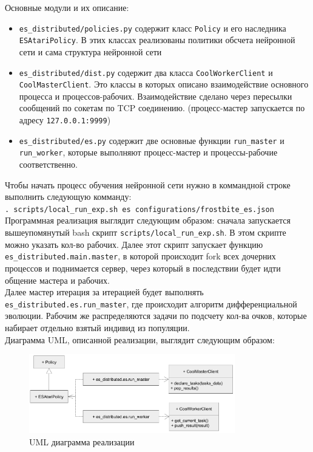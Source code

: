 \documentclass[12pt]{article}
\begin{document}
    Основные модули и их описание:
    \begin{itemize}
        \item \verb!es_distributed/policies.py! содержит класс \verb!Policy! и его наследника \verb!ESAtariPolicy!. В этих классах реализованы политики обсчета нейронной сети и сама структура нейронной сети
        \item \verb!es_distributed/dist.py! содержит два класса \verb!CoolWorkerClient! и \verb!CoolMasterClient!. Это классы в которых описано взаимодействие основного процесса и процессов-рабочих. Взаимодействие сделано через пересылки сообщений по сокетам по TCP соединению. (процесс-мастер запускается по адресу \verb!127.0.0.1:9999!)
        \item \verb!es_distributed/es.py! содержит две основные функции \verb!run_master! и \verb!run_worker!, которые выполняют процесс-мастер и процессы-рабочие соответственно.
    \end{itemize}

    Чтобы начать процесс обучения нейронной сети нужно в коммандной строке выполнить следующую комманду: \\
    \verb!. scripts/local_run_exp.sh es configurations/frostbite_es.json! \\

    Программная реализация выглядит следующим образом: сначала запускается вышеупомянутый bash скрипт \verb!scripts/local_run_exp.sh!. В этом скрипте можно указать кол-во рабочих. Далее этот скрипт запускает функцию \verb!es_distributed.main.master!, в которой происходит fork всех дочерних процессов и поднимается сервер, через который в последствии будет идти общение мастера и рабочих. \\

    Далее мастер итерация за итерацией будет выполнять \verb!es_distributed.es.run_master!, где происходит алгоритм дифференциальной эволюции. Рабочим же распределяются задачи по подсчету кол-ва очков, которые набирает отдельно взятый индивид из популяции. \\

    Диаграмма UML, описанной реализации, выглядит следующим образом:
    \begin{figure}[h]
        \centering
        \includegraphics[width=0.8\textwidth]{uml.png}
        \caption{UML диаграмма реализации}
    \end{figure}
    
\end{document}
